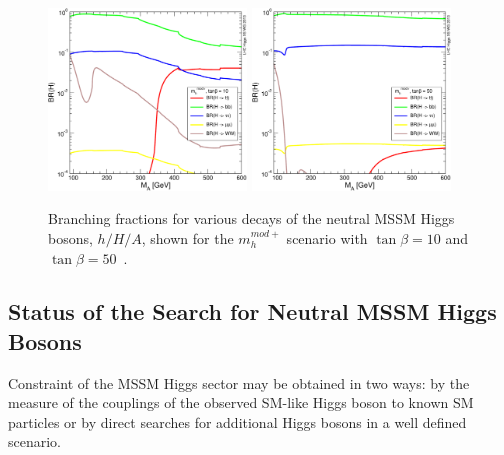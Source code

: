 \begin{figure}[tp]
\begin{center}
            \includegraphics[width=0.47\textwidth]{figure/BR_higgs/YRHXS3_BR_fig37.pdf}
            \includegraphics[width=0.47\textwidth]{figure/BR_higgs/YRHXS3_BR_fig38.pdf}

    \end{center}
    \caption{Branching fractions for various decays of the neutral MSSM Higgs bosons, $h/H/A$, shown for the  $m_h^{mod+}$ scenario with $\tan\beta=10$ and
	$\tan\beta=50$~\cite{LHCxsec}.}
   \label{fig:br}

\end{figure}



\subsection{Status of the Search for Neutral MSSM Higgs Bosons}

Constraint of the MSSM Higgs sector may be obtained in two ways: by the measure 
of the couplings of the observed SM-like Higgs boson to known SM particles or  by direct searches for additional Higgs bosons in a well 
defined scenario.

